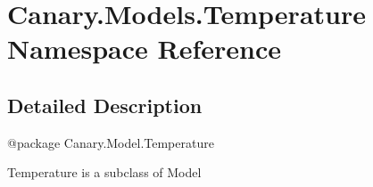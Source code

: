 \hypertarget{namespace_canary_1_1_models_1_1_temperature}{\section{Canary.\-Models.\-Temperature Namespace Reference}
\label{namespace_canary_1_1_models_1_1_temperature}
}


\subsection{Detailed Description}
\begin{DoxyVerb}@package Canary.Model.Temperature

Temperature is a subclass of Model
\end{DoxyVerb}
 